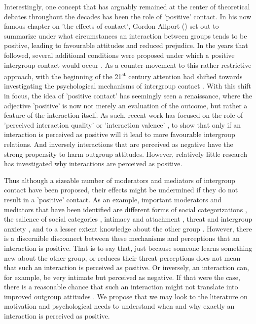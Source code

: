 \documentclass[man, 12pt, a4paper]{apa7}
\theoremstyle{break}
\theoremstyle{plain}
\begin{document}
Interestingly, one concept that has arguably remained at the center of theoretical debates throughout the decades has been the role of 'positive' contact. In his now famous chapter on 'the effects of contact', Gordon Allport (\citeyear{Allport1954b}) set out to summarize under what circumstances an interaction between groups tends to be positive, leading to favourable attitudes and reduced prejudice. In the years that followed, several additional conditions were proposed under which a positive intergroup contact would occur \citep[for a critical review see][]{Pettigrew1986}. As a counter-movement to this rather restrictive approach, with the beginning of the 21\textsuperscript{st} century attention had shifted towards investigating the psychological mechanisms of intergroup contact \citep[e.g. see,][]{Paolini2021}. With this shift in focus, the idea of 'positive contact' has seemingly seen a renaissance, where the adjective 'positive' is now not merely an evaluation of the outcome, but rather a feature of the interaction itself. As such, recent work has focused on the role of 'perceived interaction quality' \citep[e.g.,][]{Brown2007, Voci2003} or 'interaction valence' \citep[e.g.,][]{Tropp2016, Barlow2012}, to show that only if an interaction is perceived as positive will it lead to more favourable intergroup relations. And inversely interactions that are perceived as negative have the strong propensity to harm outgroup attitudes. However, relatively little research has investigated why interactions are perceived as positive.

Thus although a sizeable number of moderators and mediators of intergroup contact have been proposed, their effects might be undermined if they do not result in a 'positive' contact. As an example, important moderators and mediators that have been identified are different forms of social categorizations \citep[][]{Pettigrew1998}, the salience of social categories \citep[][]{Brown2005}, intimacy \citep[e.g.,][]{Marinucci2021} and attachment \citep[e.g.,][]{Tropp2021}, threat and intergroup anxiety \citep[e.g.,][]{Stephan2008, Paolini2004}, and to a lesser extent knowledge about the other group \citep[][]{Pettigrew2008c}. However, there is a discernible disconnect between these mechanisms and perceptions that an interaction is positive. That is to say that, just because someone learns something new about the other group, or reduces their threat perceptions does not mean that such an interaction is perceived as positive. Or inversely, an interaction can, for example, be very intimate but perceived as negative. If that were the case, there is a reasonable chance that such an interaction might not translate into improved outgroup attitudes \citep[e.g.,][]{Barlow2012}. We propose that we may look to the literature on motivation and psychological needs to understand when and why exactly an interaction is perceived as positive.
\end{document}
